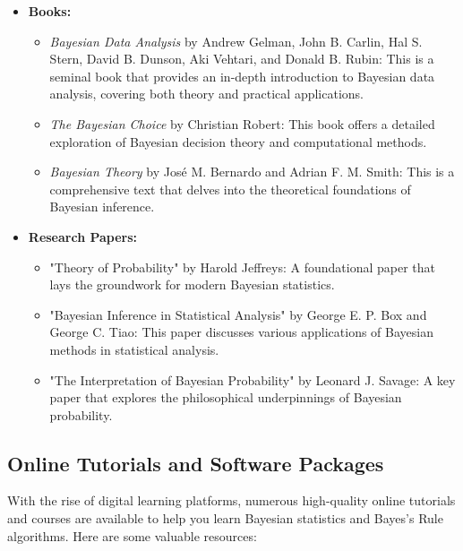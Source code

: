 \documentclass[12pt]{book} %
\begin{document}
\begin{itemize}
    \item \textbf{Books:}
        \begin{itemize}
            \item \textit{Bayesian Data Analysis} by Andrew Gelman, John B. Carlin, Hal S. Stern, David B. Dunson, Aki Vehtari, and Donald B. Rubin: This is a seminal book that provides an in-depth introduction to Bayesian data analysis, covering both theory and practical applications.
            \item \textit{The Bayesian Choice} by Christian Robert: This book offers a detailed exploration of Bayesian decision theory and computational methods.
            \item \textit{Bayesian Theory} by José M. Bernardo and Adrian F. M. Smith: This is a comprehensive text that delves into the theoretical foundations of Bayesian inference.
        \end{itemize}
    \item \textbf{Research Papers:}
        \begin{itemize}
            \item "Theory of Probability" by Harold Jeffreys: A foundational paper that lays the groundwork for modern Bayesian statistics.
            \item "Bayesian Inference in Statistical Analysis" by George E. P. Box and George C. Tiao: This paper discusses various applications of Bayesian methods in statistical analysis.
            \item "The Interpretation of Bayesian Probability" by Leonard J. Savage: A key paper that explores the philosophical underpinnings of Bayesian probability.
        \end{itemize}
\end{itemize}

\subsection{Online Tutorials and Software Packages}
With the rise of digital learning platforms, numerous high-quality online tutorials and courses are available to help you learn Bayesian statistics and Bayes's Rule algorithms. Here are some valuable resources:
\end{document}
